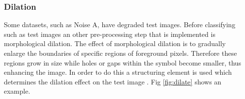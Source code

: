 \vspace{100mm}

\subsubsection{Dilation}
Some datasets, such as Noise A, have degraded test images. Before classifying such as test images an other pre-processing step that is implemented is morphological dilation. 
The effect of morphological dilation is to gradually enlarge the boundaries of specific regions of foreground pixels. Therefore these regions grow in size while holes or gaps within the symbol become smaller, thus enhancing the image. In order to do this a structuring element is used which determines the dilation effect on the test image \cite{dilation}. Fig \ref{fig:dilate} shows an example.

